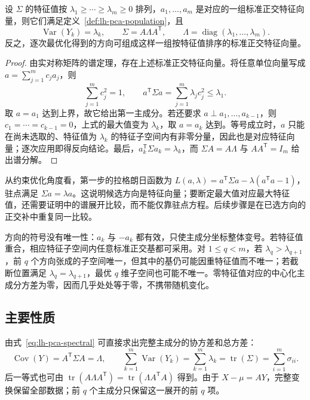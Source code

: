 \begin{theorem}[主成分与协方差矩阵的谱分解]
\label{thm:lh-pca-eigen}
设 $\Sigma$ 的特征值按 $\lambda_1\geq\cdots\geq\lambda_m\geq0$ 排列，$a_1,\ldots,a_m$ 是对应的一组标准正交特征向量，则它们满足定义~\ref{def:lh-pca-population}，且
\begin{equation}
\operatorname{Var}(Y_k)=\lambda_k,\qquad
\Sigma=A\Lambda A^{\mathsf T},\qquad
\Lambda=\operatorname{diag}(\lambda_1,\ldots,\lambda_m).
\label{eq:lh-pca-spectral}
\end{equation}
反之，逐次最优化得到的方向可组成这样一组按特征值排序的标准正交特征向量。
\end{theorem}
\begin{proof}
由实对称矩阵的谱定理，存在上述标准正交特征向量。将任意单位向量写成 $a=\sum_{j=1}^m c_j a_j$，则
\[
\sum_{j=1}^m c_j^2=1,\qquad
a^{\mathsf T}\Sigma a=\sum_{j=1}^m\lambda_j c_j^2
\leq\lambda_1.
\]
取 $a=a_1$ 达到上界，故它给出第一主成分。若还要求 $a\perp a_1,\ldots,a_{k-1}$，则 $c_1=\cdots=c_{k-1}=0$，上式的最大值变为 $\lambda_k$，取 $a=a_k$ 达到。等号成立时，$a$ 只能在尚未选取的、特征值为 $\lambda_k$ 的特征子空间内有非零分量，因此也是对应特征向量；逐次应用即得反向结论。最后，$a_k^{\mathsf T}\Sigma a_k=\lambda_k$，而 $\Sigma A=A\Lambda$ 与 $AA^{\mathsf T}=I_m$ 给出谱分解。
\end{proof}

从约束优化角度看，第一步的拉格朗日函数为 $L(a,\lambda)=a^{\mathsf T}\Sigma a-\lambda(a^{\mathsf T}a-1)$，驻点满足 $\Sigma a=\lambda a$。这说明候选方向是特征向量；要断定最大值对应最大特征值，还需要证明中的谱展开比较，而不能仅靠驻点方程。后续步骤是在已选方向的正交补中重复同一比较。

方向的符号没有唯一性：$a_k$ 与 $-a_k$ 都有效，只使主成分坐标整体变号。若特征值重合，相应特征子空间内任意标准正交基都可采用。对 $1\leq q<m$，若 $\lambda_q>\lambda_{q+1}$，前 $q$ 个方向张成的子空间唯一，但其中的基仍可能因重特征值而不唯一；若截断位置满足 $\lambda_q=\lambda_{q+1}$，最优 $q$ 维子空间也可能不唯一。零特征值对应的中心化主成分方差为零，因而几乎处处等于零，不携带随机变化。

\subsection{主要性质}
\label{subsec:lh-pca-properties}

由式~\eqref{eq:lh-pca-spectral} 可直接求出完整主成分的协方差和总方差：
\begin{equation}
\operatorname{Cov}(Y)=A^{\mathsf T}\Sigma A=\Lambda,\qquad
\sum_{k=1}^m\operatorname{Var}(Y_k)
=\sum_{k=1}^m\lambda_k
=\operatorname{tr}(\Sigma)=\sum_{i=1}^m\sigma_{ii}.
\label{eq:lh-pca-trace}
\end{equation}
后一等式也可由 $\operatorname{tr}(A\Lambda A^{\mathsf T})=\operatorname{tr}(\Lambda A^{\mathsf T}A)$ 得到。由于 $X-\mu=AY$，完整变换保留全部数据；前 $q$ 个主成分只保留这一展开的前 $q$ 项。

